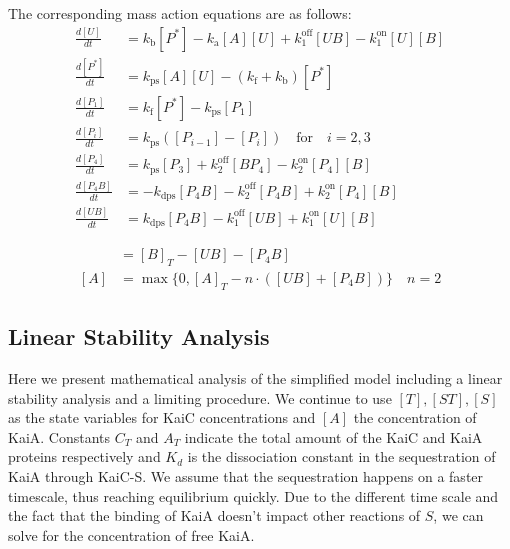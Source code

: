 \documentclass[a4paper,10pt]{article}
\numberwithin{equation}{section}
\begin{document}
The corresponding mass action equations are as follows:
\begin{align*}
\frac{d[U]}{dt}&=k_{\mathrm b}[P^{*}]-k_{\mathrm{a}} [A][U]+k_{1}^{\mathrm{off}}[UB] -k_{1}^{\mathrm{on}}[U][B] \\
\frac{d[P^{*}]}{dt}&=k_{\mathrm{ps}} [A][U]-(k_{\mathrm f}+k_{\mathrm b})[P^{*}]\\
\frac{d[P_{1}]}{dt}&=k_{\mathrm f}[P^{*}]-k_{\mathrm{ps}}[P_{1}]\\
\frac{d[P_{i}]}{dt}&=k_{\mathrm{ps}}([P_{i-1}]-[P_{i}]) \quad \mathrm{for} \quad i=2,3\\
\frac{d[P_{4}]}{dt}&=k_{\mathrm{ps}}[P_{3}]+k_{2}^{\mathrm{off}}[BP_{4}] -k_{2}^{\mathrm{on}}[P_{4}][B] \\
\frac{d[P_{4}B]}{dt}&=-k_{\mathrm{dps}}[P_{4}B]-k_{2}^{\mathrm{off}}[P_{4}B] +k_{2}^{\mathrm{on}}[P_{4}][B]\\
\frac{d[UB]}{dt}&=k_{\mathrm{dps}}[P_{4}B]-k_{1}^{\mathrm{off}}[UB] +k_{1}^{\mathrm{on}}[U][B]
\end{align*}


\begin{align*}
[B]&=[B]_{T}-[UB]-[P_{4}B]\\
[A]&=\max\{0,[A]_{T}-n\cdot \left([UB]+[P_{4}B]\right) \}\quad n=2
\end{align*}




\subsection{Linear Stability Analysis}
Here we present mathematical analysis of the simplified model including a linear stability analysis and a limiting procedure. 
We continue to use $[T], [ST], [S]$ as the state variables for KaiC concentrations and $[A]$ the concentration of KaiA. Constants $C_T$ and $A_T$ indicate the total amount of the KaiC and KaiA proteins respectively and $K_d$ is the dissociation constant in the sequestration of KaiA through KaiC-S. We assume that the sequestration happens on a faster timescale, thus reaching equilibrium quickly. Due to the different time scale and the fact that the binding of KaiA doesn't impact other reactions of $S$, we can solve for the concentration of free KaiA.
\end{document}
